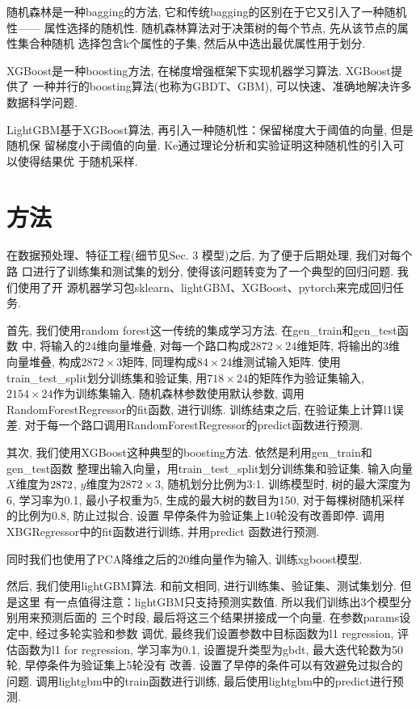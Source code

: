 \documentclass[a4paper,UTF8]{article}
\begin{document}
随机森林是一种bagging的方法, 它和传统bagging的区别在于它又引入了一种随机性——
属性选择的随机性. 随机森林算法对于决策树的每个节点, 先从该节点的属性集合种随机
选择包含k个属性的子集, 然后从中选出最优属性用于划分. 

XGBoost是一种boosting方法, 在梯度增强框架下实现机器学习算法. XGBoost提供了
一种并行的boosting算法(也称为GBDT、GBM), 可以快速、准确地解决许多数据科学问题. 

LightGBM基于XGBoost算法, 再引入一种随机性：保留梯度大于阈值的向量, 但是随机保
留梯度小于阈值的向量. Ke\cite{ref3}通过理论分析和实验证明这种随机性的引入可以使得结果优
于随机采样. 

\section{方法}
在数据预处理、特征工程(细节见Sec. 3 模型)之后, 为了便于后期处理, 我们对每个路
口进行了训练集和测试集的划分, 使得该问题转变为了一个典型的回归问题. 我们使用了开
源机器学习包sklearn、lightGBM、XGBoost、pytorch来完成回归任务. 

首先, 我们使用random forest这一传统的集成学习方法. 在gen\_train和gen\_test函数
中, 将输入的24维向量堆叠, 对每一个路口构成$2872 \times 24$维矩阵, 将输出的3维
向量堆叠, 构成$2872 \times 3$矩阵, 同理构成$84 \times 24$维测试输入矩阵. 使用
train\_test\_split划分训练集和验证集, 用$718 \times 24$的矩阵作为验证集输入,
$2154 \times 24$作为训练集输入. 随机森林参数使用默认参数, 调用
RandomForestRegressor的fit函数, 进行训练. 训练结束之后, 在验证集上计算l1误差. 
对于每一个路口调用RandomForestRegressor的predict函数进行预测. 

其次, 我们使用XGBoost这种典型的boosting方法. 依然是利用gen\_train和gen\_test函数
整理出输入向量，用train\_test\_split划分训练集和验证集. 输入向量$X$维度为$2872\time 24$,
$y$维度为$2872\times 3$, 随机划分比例为3:1. 训练模型时, 树的最大深度为6, 学习率为0.1, 
最小子权重为5, 生成的最大树的数目为150, 对于每棵树随机采样的比例为0.8, 防止过拟合, 设置
早停条件为验证集上10轮没有改善即停. 调用XBGRegressor中的fit函数进行训练, 并用predict
函数进行预测.

同时我们也使用了PCA降维之后的20维向量作为输入, 训练xgboost模型. 

然后, 我们使用lightGBM算法. 和前文相同, 进行训练集、验证集、测试集划分. 但是这里
有一点值得注意：lightGBM只支持预测实数值. 所以我们训练出3个模型分别用来预测后面的
三个时段, 最后将这三个结果拼接成一个向量. 在参数params设定中, 经过多轮实验和参数
调优, 最终我们设置参数中目标函数为l1 regression, 评估函数为l1 for regression,
学习率为0.1, 设置提升类型为gbdt, 最大迭代轮数为50轮, 早停条件为验证集上5轮没有
改善. 设置了早停的条件可以有效避免过拟合的问题. 调用lightgbm中的train函数进行训练,
最后使用lightgbm中的predict进行预测. 
\end{document}
